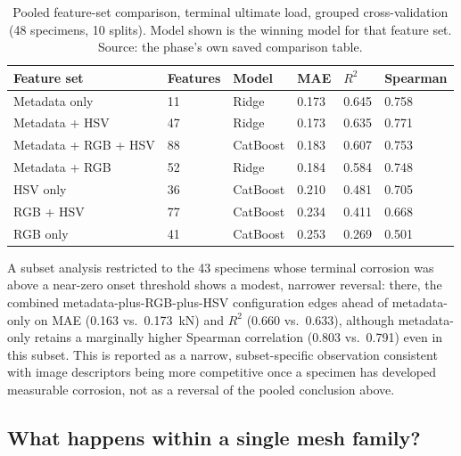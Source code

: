 \begin{table}[htbp]
\centering
\caption{Pooled feature-set comparison, terminal ultimate load, grouped
cross-validation (48 specimens, 10 splits). Model shown is the winning
model for that feature set. Source: the phase's own saved comparison
table.}
\label{tab:phase4b-featuresets}
\begin{tabular}{p{4.1cm}p{1.3cm}p{1.4cm}p{1.1cm}p{1.1cm}p{1.3cm}}
\toprule
Feature set & Features & Model & MAE & $R^2$ & Spearman \\
\midrule
Metadata only & 11 & Ridge & 0.173 & 0.645 & 0.758 \\
Metadata + HSV & 47 & Ridge & 0.173 & 0.635 & 0.771 \\
Metadata + RGB + HSV & 88 & CatBoost & 0.183 & 0.607 & 0.753 \\
Metadata + RGB & 52 & Ridge & 0.184 & 0.584 & 0.748 \\
HSV only & 36 & CatBoost & 0.210 & 0.481 & 0.705 \\
RGB + HSV & 77 & CatBoost & 0.234 & 0.411 & 0.668 \\
RGB only & 41 & CatBoost & 0.253 & 0.269 & 0.501 \\
\bottomrule
\end{tabular}
\end{table}

A subset analysis restricted to the 43 specimens whose terminal corrosion
was above a near-zero onset threshold shows a modest, narrower reversal:
there, the combined metadata-plus-RGB-plus-HSV configuration edges ahead of
metadata-only on MAE (0.163 vs.\ 0.173~kN) and $R^2$ (0.660 vs.\ 0.633),
although metadata-only retains a marginally higher Spearman correlation
(0.803 vs.\ 0.791) even in this subset. This is reported as a narrow,
subset-specific observation consistent with image descriptors being more
competitive once a specimen has developed measurable corrosion, not as a
reversal of the pooled conclusion above.

\subsection{What happens within a single mesh family?}


